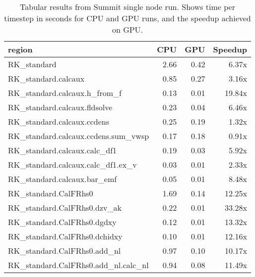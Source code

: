 \begin{table*}[htb]
  \centering
  \begin{tabular}{|l|rrr|}
  \hline
  region & CPU & GPU & Speedup \\
  \hline
  RK{\_}standard                                          &   2.66 &  0.42 &  6.37x \\
  RK{\_}standard.calcaux                                  &   0.85 &  0.27 &  3.16x \\
  RK{\_}standard.calcaux.h{\_}from{\_}f                   &   0.13 &  0.01 & 19.84x \\
  RK{\_}standard.calcaux.fldsolve                         &   0.23 &  0.04 &  6.46x \\
  RK{\_}standard.calcaux.ccdens                           &   0.25 &  0.19 &  1.32x \\
  RK{\_}standard.calcaux.ccdens.sum{\_}vwsp               &   0.17 &  0.18 &  0.91x \\
  RK{\_}standard.calcaux.calc{\_}df1                      &   0.19 &  0.03 &  5.92x \\
  RK{\_}standard.calcaux.calc{\_}df1.ex{\_}v              &   0.03 &  0.01 &  2.33x \\
  RK{\_}standard.calcaux.bar{\_}emf                       &   0.05 &  0.01 &  8.48x \\
  RK{\_}standard.CalFRhs0                                 &   1.69 &  0.14 & 12.25x \\
  RK{\_}standard.CalFRhs0.dzv{\_}ak                       &   0.22 &  0.01 & 33.28x \\
  RK{\_}standard.CalFRhs0.dgdxy                           &   0.12 &  0.01 & 13.32x \\
  RK{\_}standard.CalFRhs0.dchidxy                         &   0.10 &  0.01 & 12.16x \\
  RK{\_}standard.CalFRhs0.add{\_}nl                       &   0.97 &  0.10 & 10.17x \\
  RK{\_}standard.CalFRhs0.add{\_}nl.calc{\_}nl            &   0.94 &  0.08 & 11.49x \\
  \hline
  \end{tabular}
  \caption{Tabular results from Summit single node run. Shows time per timestep in seconds for CPU and GPU runs, and the speedup achieved on GPU.}
  \label{tab:single_node}
\end{table*}
